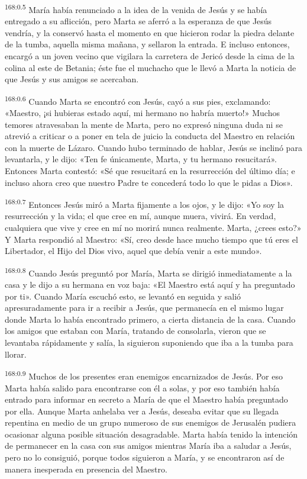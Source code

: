 \par 
\textsuperscript{168:0.5} María había renunciado a la idea de la venida de Jesús y se había entregado a su aflicción, pero Marta se aferró a la esperanza de que Jesús vendría, y la conservó hasta el momento en que hicieron rodar la piedra delante de la tumba, aquella misma mañana, y sellaron la entrada. E incluso entonces, encargó a un joven vecino que vigilara la carretera de Jericó desde la cima de la colina al este de Betania; éste fue el muchacho que le llevó a Marta la noticia de que Jesús y sus amigos se acercaban.

\par 
\textsuperscript{168:0.6} Cuando Marta se encontró con Jesús, cayó a sus pies, exclamando: «Maestro, ¡si hubieras estado aquí, mi hermano no habría muerto!» Muchos temores atravesaban la mente de Marta, pero no expresó ninguna duda ni se atrevió a criticar o a poner en tela de juicio la conducta del Maestro en relación con la muerte de Lázaro. Cuando hubo terminado de hablar, Jesús se inclinó para levantarla, y le dijo: «Ten fe únicamente, Marta, y tu hermano resucitará». Entonces Marta contestó: «Sé que resucitará en la resurrección del último día; e incluso ahora creo que nuestro Padre te concederá todo lo que le pidas a Dios».

\par 
\textsuperscript{168:0.7} Entonces Jesús miró a Marta fijamente a los ojos, y le dijo: «Yo soy la resurrección y la vida; el que cree en mí, aunque muera, vivirá. En verdad, cualquiera que vive y cree en mí no morirá nunca realmente. Marta, ¿crees esto?» Y Marta respondió al Maestro: «Sí, creo desde hace mucho tiempo que tú eres el Libertador, el Hijo del Dios vivo, aquel que debía venir a este mundo».

\par 
\textsuperscript{168:0.8} Cuando Jesús preguntó por María, Marta se dirigió inmediatamente a la casa y le dijo a su hermana en voz baja: «El Maestro está aquí y ha preguntado por ti». Cuando María escuchó esto, se levantó en seguida y salió apresuradamente para ir a recibir a Jesús, que permanecía en el mismo lugar donde Marta lo había encontrado primero, a cierta distancia de la casa. Cuando los amigos que estaban con María, tratando de consolarla, vieron que se levantaba rápidamente y salía, la siguieron suponiendo que iba a la tumba para llorar.

\par 
\textsuperscript{168:0.9} Muchos de los presentes eran enemigos encarnizados de Jesús. Por eso Marta había salido para encontrarse con él a solas, y por eso también había entrado para informar en secreto a María de que el Maestro había preguntado por ella. Aunque Marta anhelaba ver a Jesús, deseaba evitar que su llegada repentina en medio de un grupo numeroso de sus enemigos de Jerusalén pudiera ocasionar alguna posible situación desagradable. Marta había tenido la intención de permanecer en la casa con sus amigos mientras María iba a saludar a Jesús, pero no lo consiguió, porque todos siguieron a María, y se encontraron así de manera inesperada en presencia del Maestro.

